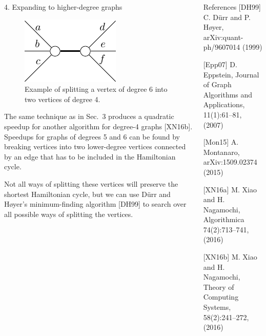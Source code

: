 \documentclass[]{templates/poster}
\begin{document}
\begin{frame}{}
\begin{columns}[t]
\begin{column}{0.422\linewidth}
  \begin{block}{\Large 4. Expanding to higher-degree graphs}
  \begin{figure}
  \includegraphics[width=\linewidth]{deg5}
  \caption{Example of splitting a vertex of degree 6 into two vertices of degree 4.}
  \end{figure}

  The same technique as in Sec.\ 3 produces a quadratic speedup for another algorithm for degree-4 graphs [XN16b]. Speedups for graphs of degrees 5 and 6 can be found by breaking vertices into two lower-degree vertices connected by an edge that has to be included in the Hamiltonian cycle.
  
  Not all ways of splitting these vertices will preserve the shortest Hamiltonian cycle, but we can use D\"urr and H\o yer's minimum-finding algorithm [DH99] to search over all possible ways of splitting the vertices.
  \end{block}
  \end{column}

  \begin{column}{0.422\linewidth}
  \begin{block}{\Large References}
  [DH99] C. D\"urr and P. H\o yer, arXiv:quant-ph/9607014 (1999)

  [Epp07] D. Eppstein, Journal of Graph Algorithms and Applications, 11(1):61--81, (2007)

  [Mon15] A. Montanaro, arXiv:1509.02374 (2015)

  [XN16a] M. Xiao and H. Nagamochi, Algorithmica 74(2):713--741, (2016)

  [XN16b] M. Xiao and H. Nagamochi, Theory of Computing Systems, 58(2):241--272, (2016)
  \end{block}
  \end{column}
\end{columns}

\end{frame}

\end{document}
